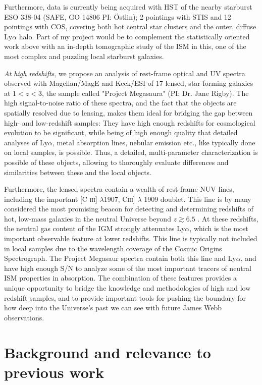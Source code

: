 \documentclass[12pt]{amsart}
\begin{document}
Furthermore, data is currently being acquired with HST of the nearby starburst
ESO 338-04 (SAFE, GO 14806 PI: \"O{}stlin); 2 pointings with STIS and 12 pointings
with COS, covering both hot central star clusters and the outer, diffuse
Ly$\alpha$ halo. Part of my project would be  to complement the statistically
oriented work above with an in-depth tomographic study of the ISM in this, one
of the most complex and puzzling local starburst galaxies.  

\emph{At high redshifts}, we propose an analysis of rest-frame optical and UV
spectra observed with Magellan/MagE and Keck/ESI of 17 lensed, star-forming
galaxies at $1 < z < 3$, the sample called "Project Megasaura" (PI: Dr. Jane
Rigby). The high signal-to-noise ratio of these spectra, and the fact that the
objects are spatially resolved due to lensing, makes them ideal for bridging the
gap between high- and low-redshift samples: They have high enough redshifts for
cosmological evolution to be significant, while being of high enough quality
that detailed analyses of Ly$\alpha$, metal absorption lines, nebular emission
etc., like typically done on local samples, is possible. Thus, a detailed,
multi-parameter characterization is possible of these objects, allowing to
thoroughly evaluate differences and similarities between these and the local
objects. 

Furthermore, the lensed spectra contain a wealth of rest-frame NUV lines,
including the important [C \textsc{iii}] $\lambda 1907$, C\textsc{iii}]
$\lambda$ 1909 doublet. This line is by many
considered the most promising beacon for detecting and determining redshifts of
hot, low-mass galaxies in the neutral Universe beyond $z\gtrsim 6.5$
\citep[e.g.][]{Stark2014,Rigby2015,Jaskot2016}.  At these redshifts, the neutral
gas content of the IGM strongly attenuates Ly$\alpha$, which is the most
important observable feature at lower redshifts. This line is typically not
included in local samples due to the wavelength coverage of the Cosmic Origins
Spectrograph.  The Project Megasaur spectra contain both this line and
Ly$\alpha$, and have high enough S/N to analyze some of the most important
tracers of neutral ISM properties in absorption. The combination of these
features provides a unique opportunity to bridge the knowledge and methodologies
of high and low redshift samples, and to provide important tools for pushing the
boundary for how deep into the Universe's past we can see with future James Webb
observations.


\section{Background and relevance to previous work}
\end{document}
